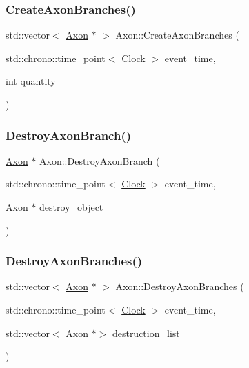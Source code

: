 \mbox{\label{classAxon_ab0da51c05a0879efdb45c594b68ef8fd}} 
\subsubsection{\texorpdfstring{Create\+Axon\+Branches()}{CreateAxonBranches()}}
{\footnotesize\ttfamily std\+::vector$<$ \mbox{\hyperlink{classAxon}{Axon}} $\ast$ $>$ Axon\+::\+Create\+Axon\+Branches (\begin{DoxyParamCaption}\item[{std\+::chrono\+::time\+\_\+point$<$ \mbox{\hyperlink{universe_8h_a0ef8d951d1ca5ab3cfaf7ab4c7a6fd80}{Clock}} $>$}]{event\+\_\+time,  }\item[{int}]{quantity }\end{DoxyParamCaption})}

\mbox{\label{classAxon_a6ac580e4565d24c955b0a48d7a8b20e2}} 
\subsubsection{\texorpdfstring{Destroy\+Axon\+Branch()}{DestroyAxonBranch()}}
{\footnotesize\ttfamily \mbox{\hyperlink{classAxon}{Axon}} $\ast$ Axon\+::\+Destroy\+Axon\+Branch (\begin{DoxyParamCaption}\item[{std\+::chrono\+::time\+\_\+point$<$ \mbox{\hyperlink{universe_8h_a0ef8d951d1ca5ab3cfaf7ab4c7a6fd80}{Clock}} $>$}]{event\+\_\+time,  }\item[{\mbox{\hyperlink{classAxon}{Axon}} $\ast$}]{destroy\+\_\+object }\end{DoxyParamCaption})}

\mbox{\label{classAxon_aa9d26eed8d178527d1995adfad2f67ac}} 
\subsubsection{\texorpdfstring{Destroy\+Axon\+Branches()}{DestroyAxonBranches()}}
{\footnotesize\ttfamily std\+::vector$<$ \mbox{\hyperlink{classAxon}{Axon}} $\ast$ $>$ Axon\+::\+Destroy\+Axon\+Branches (\begin{DoxyParamCaption}\item[{std\+::chrono\+::time\+\_\+point$<$ \mbox{\hyperlink{universe_8h_a0ef8d951d1ca5ab3cfaf7ab4c7a6fd80}{Clock}} $>$}]{event\+\_\+time,  }\item[{std\+::vector$<$ \mbox{\hyperlink{classAxon}{Axon}} $\ast$$>$}]{destruction\+\_\+list }\end{DoxyParamCaption})}

